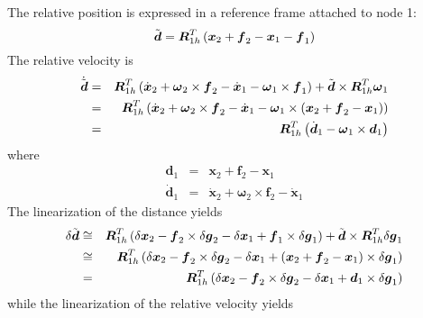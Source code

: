 \documentclass[10pt,dvips,fleqn]{report}
\newcommand{\T}[1]{\boldsymbol{#1}}
\begin{document}
The relative position is expressed in a reference frame attached to node 1:
\begin{equation}
	\tilde{\T{d}} = \T{R}_{1h}^T\plbr{
		\T{x}_2 + \T{f}_2 - \T{x}_1 - \T{f}_1
	}
\end{equation}
The relative velocity is
\begin{eqnarray*}
	\dot{\tilde{\T{d}}} & = & \T{R}_{1h}^T\plbr{
		\dot{\T{x}}_2 + \T{\omega}_2\times\T{f}_2
		- \dot{\T{x}}_1 - \T{\omega}_1\times\T{f}_1
	} + \tilde{\T{d}}\times\T{R}_{1h}^T \T{\omega}_1 \\
	& = & \T{R}_{1h}^T\plbr{
		\dot{\T{x}}_2
		+ \T{\omega}_2\times\T{f}_2
		- \dot{\T{x}}_1
		- \T{\omega}_1\times\plbr{
			\T{x}_2
			+ \T{f}_2
			- \T{x}_1
		}
	} \\
	& = & \T{R}_{1h}^T\plbr{
		\dot{\T{d}}_1 - \T{\omega}_1 \times \T{d}_1
	}
\end{eqnarray*}
where
\begin{eqnarray*}
	\T{d}_1 & = & \T{x}_2 + \T{f}_2 - \T{x}_1 \\
	\dot{\T{d}}_1 & = & \dot{\T{x}}_2 + \T{\omega}_2 \times \T{f}_2 - \dot{\T{x}}_1
\end{eqnarray*}
The linearization of the distance yields
\begin{eqnarray*}
	\delta{\tilde{\T{d}}} & \cong & \T{R}_{1h}^T\plbr{
		\delta{\T{x}}_2 - \T{f}_2\times\delta\T{g}_2
		- \delta{\T{x}}_1 + \T{f}_1\times\delta\T{g}_1
	} + \tilde{\T{d}}\times\T{R}_{1h}^T \delta\T{g}_1 \\
	& \cong & \T{R}_{1h}^T\plbr{
		\delta{\T{x}}_2
		- \T{f}_2\times\delta\T{g}_2
		- \delta{\T{x}}_1
		+ \plbr{
			\T{x}_2
			+ \T{f}_2
			- \T{x}_1
		}\times\delta\T{g}_1
	} \\
	& = & \T{R}_{1h}^T\plbr{
		\delta{\T{x}}_2
		- \T{f}_2\times\delta\T{g}_2
		- \delta{\T{x}}_1
		+ \T{d}_1\times\delta\T{g}_1
	}
\end{eqnarray*}
while the linearization of the relative velocity yields
\end{document}
